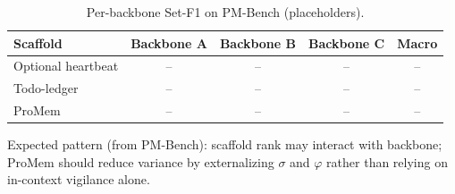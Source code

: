 \begin{table}[h]
\centering
\caption{Per-backbone Set-F1 on PM-Bench (placeholders).}
\label{tab:per-backbone}
\begin{tabular}{l|cccc}
\toprule
\textbf{Scaffold} & Backbone A & Backbone B & Backbone C & Macro \\
\midrule
Optional heartbeat & -- & -- & -- & -- \\
Todo-ledger & -- & -- & -- & -- \\
ProMem & -- & -- & -- & -- \\
\bottomrule
\end{tabular}
\end{table}

\noindent Expected pattern (from PM-Bench): scaffold rank may interact with backbone; ProMem should reduce variance by externalizing $\sigma$ and $\varphi$ rather than relying on in-context vigilance alone.
